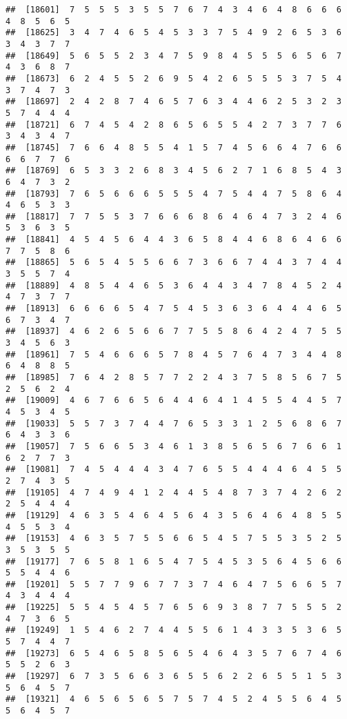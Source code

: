\documentclass[
]{book}
\begin{document}
\begin{verbatim}
##  [18601]  7  5  5  5  3  5  5  7  6  7  4  3  4  6  4  8  6  6  6  4  8  5  6  5
##  [18625]  3  4  7  4  6  5  4  5  3  3  7  5  4  9  2  6  5  3  6  3  4  3  7  7
##  [18649]  5  6  5  5  2  3  4  7  5  9  8  4  5  5  5  6  5  6  7  4  3  6  8  7
##  [18673]  6  2  4  5  5  2  6  9  5  4  2  6  5  5  5  3  7  5  4  3  7  4  7  3
##  [18697]  2  4  2  8  7  4  6  5  7  6  3  4  4  6  2  5  3  2  3  5  7  4  4  4
##  [18721]  6  7  4  5  4  2  8  6  5  6  5  5  4  2  7  3  7  7  6  3  4  3  4  7
##  [18745]  7  6  6  4  8  5  5  4  1  5  7  4  5  6  6  4  7  6  6  6  6  7  7  6
##  [18769]  6  5  3  3  2  6  8  3  4  5  6  2  7  1  6  8  5  4  3  6  4  7  3  2
##  [18793]  7  6  5  6  6  6  5  5  5  4  7  5  4  4  7  5  8  6  4  4  6  5  3  3
##  [18817]  7  7  5  5  3  7  6  6  6  8  6  4  6  4  7  3  2  4  6  5  3  6  3  5
##  [18841]  4  5  4  5  6  4  4  3  6  5  8  4  4  6  8  6  4  6  6  7  7  5  8  6
##  [18865]  5  6  5  4  5  5  6  6  7  3  6  6  7  4  4  3  7  4  4  3  5  5  7  4
##  [18889]  4  8  5  4  4  6  5  3  6  4  4  3  4  7  8  4  5  2  4  4  7  3  7  7
##  [18913]  6  6  6  6  5  4  7  5  4  5  3  6  3  6  4  4  4  6  5  6  7  3  4  7
##  [18937]  4  6  2  6  5  6  6  7  7  5  5  8  6  4  2  4  7  5  5  3  4  5  6  3
##  [18961]  7  5  4  6  6  6  5  7  8  4  5  7  6  4  7  3  4  4  8  6  4  8  8  5
##  [18985]  7  6  4  2  8  5  7  7  2  2  4  3  7  5  8  5  6  7  5  2  5  6  2  4
##  [19009]  4  6  7  6  6  5  6  4  4  6  4  1  4  5  5  4  4  5  7  4  5  3  4  5
##  [19033]  5  5  7  3  7  4  4  7  6  5  3  3  1  2  5  6  8  6  7  6  4  3  3  6
##  [19057]  7  5  6  6  5  3  4  6  1  3  8  5  6  5  6  7  6  6  1  6  2  7  7  3
##  [19081]  7  4  5  4  4  4  3  4  7  6  5  5  4  4  4  6  4  5  5  2  7  4  3  5
##  [19105]  4  7  4  9  4  1  2  4  4  5  4  8  7  3  7  4  2  6  2  2  5  4  4  4
##  [19129]  4  6  3  5  4  6  4  5  6  4  3  5  6  4  6  4  8  5  5  4  5  5  3  4
##  [19153]  4  6  3  5  7  5  5  6  6  5  4  5  7  5  5  3  5  2  5  3  5  3  5  5
##  [19177]  7  6  5  8  1  6  5  4  7  5  4  5  3  5  6  4  5  6  6  5  5  4  4  6
##  [19201]  5  5  7  7  9  6  7  7  3  7  4  6  4  7  5  6  6  5  7  4  3  4  4  4
##  [19225]  5  5  4  5  4  5  7  6  5  6  9  3  8  7  7  5  5  5  2  4  7  3  6  5
##  [19249]  1  5  4  6  2  7  4  4  5  5  6  1  4  3  3  5  3  6  5  5  7  4  4  7
##  [19273]  6  5  4  6  5  8  5  6  5  4  6  4  3  5  7  6  7  4  6  5  5  2  6  3
##  [19297]  6  7  3  5  6  6  3  6  5  5  6  2  2  6  5  5  1  5  3  5  6  4  5  7
##  [19321]  4  6  5  6  5  6  5  7  5  7  4  5  2  4  5  5  6  4  5  5  6  4  5  7

\end{verbatim}
\end{document}
